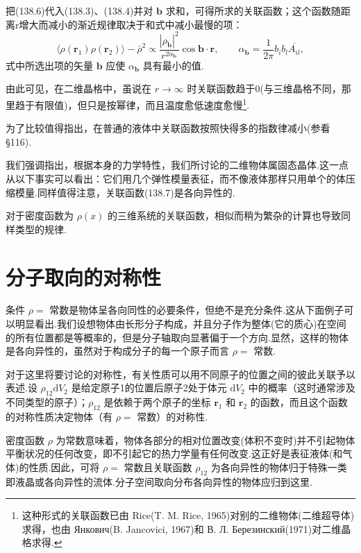 把(138.6)代入(138.3)、(138.4)并对 $\boldsymbol{b}$ 求和，可得所求的关联函数；这个函数随距离r增大而减小的渐近规律取决于和式中减小最慢的项：
\begin{equation}
  \langle\rho(\boldsymbol{r}_1)\rho(\boldsymbol{r}_2)\rangle-\bar{\rho}^2
  \propto\frac{|\rho_{\boldsymbol{b}}|^2}{r^{2\alpha_{\boldsymbol{b}}}}
  \cos\boldsymbol{b}\cdot\boldsymbol{r},\qquad
  \alpha_{\boldsymbol{b}}=\frac{1}{2\pi}b_ib_l\overline{A_{il}},
\end{equation}
式中所选出项的矢量 $\boldsymbol{b}$ 应使 $\alpha_{\boldsymbol{b}}$ 具有最小的值.

由此可见，在二维晶格中，虽说在 $r\to\infty$ 时关联函数趋于0(与三维晶格不同，那里趋于有限值)，但只是按幂律，而且温度愈低速度愈慢\footnote{这种形式的关联函数已由 Rice(T. M. Rice, 1965)对别的二维物体(二维超导体)求得，也由 Янкович(B. Jancovici, 1967)和 В. Л. Березинский(1971)对二维晶格求得.}.

为了比较值得指出，在普通的液体中关联函数按照快得多的指数律减小(参看§116).

我们强调指出，根据本身的力学特性，我们所讨论的二维物体属固态晶体.这一点从以下事实可以看出：它们用几个弹性模量表征，而不像液体那样只用单个的体压缩模量.同样值得注意，关联函数(138.7)是各向异性的.

对于密度函数为 $\rho(x)$ 的三维系统的关联函数，相似而稍为繁杂的计算也导致同样类型的规律.

\section{分子取向的对称性}

条件 $\rho=$ 常数是物体呈各向同性的必要条件，但绝不是充分条件.这从下面例子可以明显看出.我们设想物体由长形分子构成，并且分子作为整体(它的质心)在空间的所有位置都是等概率的，但是分子轴取向显著偏于一个方向.显然，这样的物体是各向异性的，虽然对于构成分子的每一个原子而言 $\rho=$ 常数.

对于这里将要讨论的对称性，有关性质可以用不同原子的位置之间的彼此关联予以表述.设 $\rho_{12}\mathrm{d}V_2$ 是给定原子1的位置后原子2处于体元 $\mathrm{d}V_2$ 中的概率（这时通常涉及不同类型的原子）；$\rho_{12}$ 是依赖于两个原子的坐标 $\boldsymbol{r}_1$ 和 $\boldsymbol{r}_2$ 的函数，而且这个函数的对称性质决定物体（有 $\rho=$ 常数）的对称性.

密度函数 $\rho$ 为常数意味着，物体各部分的相对位置改变(体积不变时)并不引起物体平衡状况的任何改变，即不引起它的热力学量有任何改变.这正好是表征液体(和气体)的性质.因此，可将 $\rho=$ 常数且关联函数 $\rho_{12}$ 为各向异性的物体归于特殊一类即液晶或各向异性的流体.分子空间取向分布各向异性的物体应归到这里.

